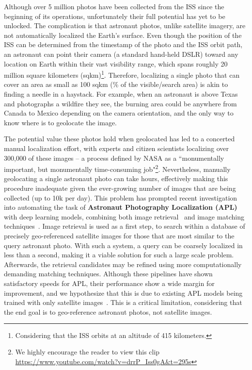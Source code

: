 Although over 5 million photos have been collected from the ISS since the beginning of its operations, unfortunately their full potential has yet to be unlocked.
The complication is that astronaut photos, unlike satellite imagery, are not automatically localized \wrt the Earth's surface.
Even though the position of the ISS can be determined from the timestamp of the photo and the ISS orbit path, an astronaut can point their camera (a standard hand-held DSLR) toward any location on Earth within their vast visibility range, which spans roughly 20 million square kilometers (sqkm)\footnote{Considering that the ISS orbits at an altitude of 415 kilometers.}.
Therefore, localizing a single photo that can cover an area as small as 100 sqkm (\% of the visible/search area) is akin to finding a needle in a haystack.
For example, when an astronaut is above Texas and photographs a wildfire they see, the burning area could be anywhere from Canada to Mexico depending on the camera orientation, and the only way to know where is to geolocate the image.

The potential value these photos hold when geolocated has led to a concerted manual localization effort, with experts and citizen scientists localizing over 300,000 of these images -- a process defined by NASA as a ``monumentally important, but monumentally time-consuming job"\footnote{We highly encourage the reader to view this clip \url{https://www.youtube.com/watch?v=drrP_Iss0gA&t=295s}}. Nevertheless, manually geolocating a single astronaut photo can take hours, effectively making this procedure inadequate given the ever-growing number of images that are being collected (up to 10k per day).
This problem has prompted recent investigation into automating the task of \textbf{Astronaut Photography Localization (APL)} with deep learning models,  combining both image retrieval~\cite{Berton_2024_EarthLoc} and image matching techniques~\cite{Stoken_2023_CVPR, Berton_2024_EarthMatch, Stoken_2024_CVPR}.
Image retrieval is used as a first step, to search within a database of precisely geo-referenced satellite images for those that are most similar to the query astronaut photo. With such a system, a query can be coarsely localized in less than a second, making it a viable solution for such a large scale problem. Afterwards, the retrieval candidates may be refined using more computationally demanding matching techniques.
Although these pipelines have shown satisfactory speeds for APL, their performance show a wide margin for improvement, and we hypothesize that this is due to existing APL models being trained with only satellite images~\cite{Berton_2024_EarthLoc}. This is a critical limitation, considering that the end goal is to geo-reference astronaut photos, not satellite images.

